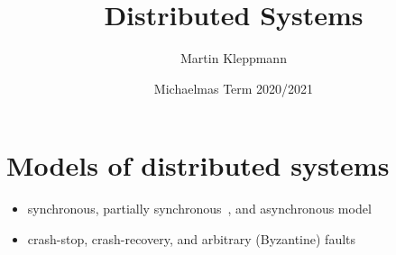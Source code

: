 \documentclass{article}
\begin{document}
\title{Distributed Systems}
\author{Martin Kleppmann}
\date{Michaelmas Term 2020/2021}
\maketitle

\section{Models of distributed systems}

\begin{itemize}
\item synchronous, partially synchronous~\cite{Dwork:1988dr}, and asynchronous model
\item crash-stop, crash-recovery, and arbitrary (Byzantine) faults
\end{itemize}


{}
\end{document}
